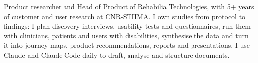{Product researcher and Head of Product of Rehabilia Technologies, with 5+ years of customer and user research at CNR-STIIMA. I own studies from protocol to findings: I plan discovery interviews, usability tests and questionnaires, run them with clinicians, patients and users with disabilities, synthesise the data and turn it into journey maps, product recommendations, reports and presentations. I use Claude and Claude Code daily to draft, analyse and structure documents.}
